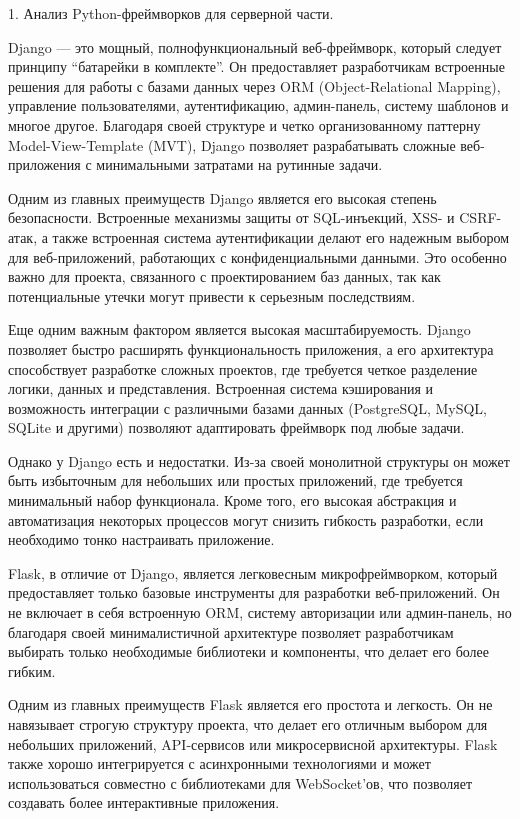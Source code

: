 1. Анализ Python-фреймворков для серверной части.

Django — это мощный, полнофункциональный веб-фреймворк, который следует принципу “батарейки в комплекте”. Он предоставляет разработчикам встроенные решения для работы с базами данных через ORM (Object-Relational Mapping), управление пользователями, аутентификацию, админ-панель, систему шаблонов и многое другое. Благодаря своей структуре и четко организованному паттерну Model-View-Template (MVT), Django позволяет разрабатывать сложные веб-приложения с минимальными затратами на рутинные задачи.

Одним из главных преимуществ Django является его высокая степень безопасности. Встроенные механизмы защиты от SQL-инъекций, XSS- и CSRF-атак, а также встроенная система аутентификации делают его надежным выбором для веб-приложений, работающих с конфиденциальными данными. Это особенно важно для проекта, связанного с проектированием баз данных, так как потенциальные утечки могут привести к серьезным последствиям.

Еще одним важным фактором является высокая масштабируемость. Django позволяет быстро расширять функциональность приложения, а его архитектура способствует разработке сложных проектов, где требуется четкое разделение логики, данных и представления. Встроенная система кэширования и возможность интеграции с различными базами данных (PostgreSQL, MySQL, SQLite и другими) позволяют адаптировать фреймворк под любые задачи.

Однако у Django есть и недостатки. Из-за своей монолитной структуры он может быть избыточным для небольших или простых приложений, где требуется минимальный набор функционала. Кроме того, его высокая абстракция и автоматизация некоторых процессов могут снизить гибкость разработки, если необходимо тонко настраивать приложение.

Flask, в отличие от Django, является легковесным микрофреймворком, который предоставляет только базовые инструменты для разработки веб-приложений. Он не включает в себя встроенную ORM, систему авторизации или админ-панель, но благодаря своей минималистичной архитектуре позволяет разработчикам выбирать только необходимые библиотеки и компоненты, что делает его более гибким.

Одним из главных преимуществ Flask является его простота и легкость. Он не навязывает строгую структуру проекта, что делает его отличным выбором для небольших приложений, API-сервисов или микросервисной архитектуры. Flask также хорошо интегрируется с асинхронными технологиями и может использоваться совместно с библиотеками для WebSocket’ов, что позволяет создавать более интерактивные приложения.

